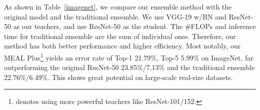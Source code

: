 \documentclass[letterpaper]{article} %
\begin{document}
\begin{table}[h]
	\centering
	\caption{ {Comparison of error rate (\%) with Dropout~\cite{srivastava2014dropout} baseline on CIFAR-10.}}
\end{table}	

 As shown in Table~\ref{imagenet}, we compare our ensemble method with the original model and the traditional ensemble. We use VGG-19 w/BN and ResNet-50 as our teachers, and use ResNet-50 as the student. The \#FLOPs and inference time for traditional ensemble are the sum of individual ones. Therefore, our method has both better performance and higher efficiency. Most notably, our MEAL Plus\footnote{denotes using more powerful teachers like ResNet-101/152.} yields an error rate of Top-1 21.79\%, Top-5 5.99\% on ImageNet, far outperforming the original ResNet-50 23.85\%/7.13\% and the traditional ensemble 22.76\%/6.49\%. This shows great potential on large-scale real-size datasets.
\end{document}
